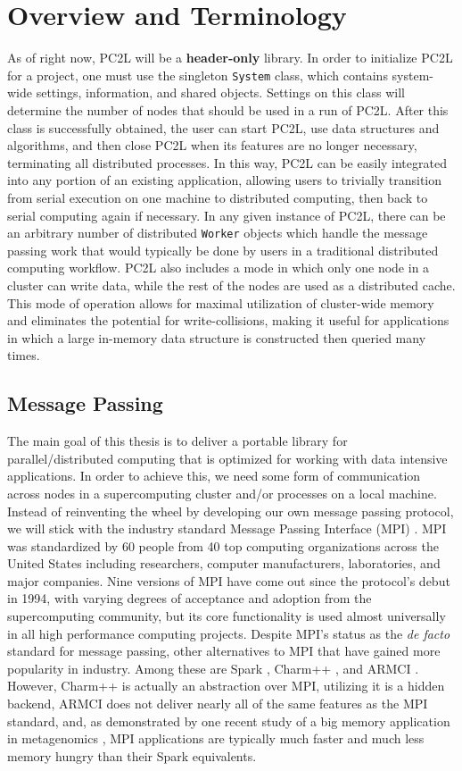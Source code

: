 \chapter{Overview and Terminology} \label{overview_term}
As of right now, PC2L will be a \textbf{header-only} library. In order to initialize PC2L for a project, one must use the singleton \texttt{System} class, which contains system-wide settings, information, and shared objects. Settings on this class will determine the number of nodes that should be used in a run of PC2L. After this class is successfully obtained, the user can start PC2L, use data structures and algorithms, and then close PC2L when its features are no longer necessary, terminating all distributed processes. In this way, PC2L can be easily integrated into any portion of an existing application, allowing users to trivially transition from serial execution on one machine to distributed computing, then back to serial computing again if necessary. In any given instance of PC2L, there can be an arbitrary number of distributed \texttt{Worker} objects which handle the message passing work that would typically be done by users in a traditional distributed computing workflow. PC2L also includes a mode in which only one node in a cluster can write data, while the rest of the nodes are used as a distributed cache. This mode of operation allows for maximal utilization of cluster-wide memory and eliminates the potential for write-collisions, making it useful for applications in which a large in-memory data structure is constructed then queried many times. 

\section{Message Passing}
The main goal of this thesis is to deliver a portable library for parallel/distributed computing that is optimized for working with data intensive applications. In order to achieve this, we need some form of communication across nodes in a supercomputing cluster and/or processes on a local machine. Instead of reinventing the wheel by developing our own message passing protocol, we will stick with the industry standard Message Passing Interface (MPI) \cite{mpi}. MPI was standardized by 60 people from 40 top computing organizations across the United States including researchers, computer manufacturers, laboratories, and major companies. Nine versions of MPI have come out since the protocol's debut in 1994, with varying degrees of acceptance and adoption from the supercomputing community, but its core functionality is used almost universally in all high performance computing projects. Despite MPI's status as the \textit{de facto} standard for message passing, other alternatives to MPI that have gained more popularity in industry. Among these are Spark \cite{spark}, Charm++ \cite{parallel_programming_w_charm}, and ARMCI \cite{ARMCI}. However, Charm++ is actually an abstraction over MPI, utilizing it is a hidden backend, ARMCI does not deliver nearly all of the same features as the MPI standard, and, as demonstrated by one recent study of a big memory application in metagenomics \cite{metagenomics}, MPI applications are typically much faster and much less memory hungry than their Spark equivalents. 

